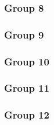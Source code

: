 \documentclass[12pt]{article}
\begin{document}
\subsubsection{Group 8}
\subsubsection{Group 9}
\subsubsection{Group 10}
\subsubsection{Group 11}
\subsubsection{Group 12}
\end{document}
